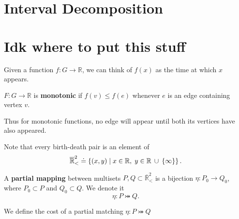 \documentclass[twoside,10pt]{report}
\begin{document}
\section{Interval Decomposition}




\section{Idk where to put this stuff}

Given a function $f:G\to \mathbb{R}$, we can think of $f(x)$ as the time at which $x$ appears.

\begin{defn}[]
	$F:G\to \mathbb{R}$ is \textbf{monotonic} if $f(v) \leq f(e)$ whenever $e$ is an edge containing vertex $v$. 
\end{defn}

Thus for monotonic functions, no edge will appear until both its vertices have also appeared.


Note that every birth-death pair is an element of
\[
	\overline{\mathbb{R}}_{<}^2 \doteq \left\{ (x,y) \;|\; x \in \mathbb{R}, \; y \in \mathbb{R} \operatorname{\;\cup\;} \left\{ \infty \right\} \right\}.
\] 

\begin{defn}[]
A \textbf{partial mapping} between {\color{red}multisets} $P,Q \subset \overline{\mathbb{R}}_{<}^2$ is a bijection $\eta: P_0 \to Q_0$, where $P_0 \subset P$ and $Q_0 \subset Q$. We denote it
\[
\eta: P\bij Q.
\] 
\end{defn}

We define the cost of a partial matching $\eta:P\bij Q$ 
\end{document}
